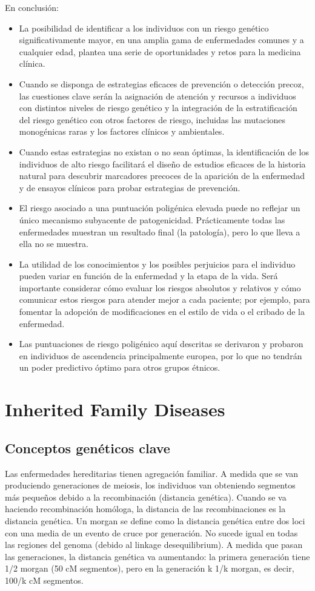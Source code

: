 En conclusión:
\begin{itemize}
\item La posibilidad de identificar a los individuos con un riesgo genético significativamente mayor, en una amplia gama de enfermedades comunes y a cualquier edad, plantea una serie de oportunidades y retos para la medicina clínica.
\item Cuando se disponga de estrategias eficaces de prevención o detección precoz, las cuestiones clave serán la asignación de atención y recursos a individuos con distintos niveles de riesgo genético y la integración de la estratificación del riesgo genético con otros factores de riesgo, incluidas las mutaciones monogénicas raras y los factores clínicos y ambientales.
\item Cuando estas estrategias no existan o no sean óptimas, la identificación de los individuos de alto riesgo facilitará el diseño de estudios eficaces de la historia natural para descubrir marcadores precoces de la aparición de la enfermedad y de ensayos clínicos para probar estrategias de prevención.
\item El riesgo asociado a una puntuación poligénica elevada puede no reflejar un único mecanismo subyacente de patogenicidad. Prácticamente todas las enfermedades muestran un resultado final (la patología), pero lo que lleva a ella no se muestra.
\item La utilidad de los conocimientos y los posibles perjuicios para el individuo pueden variar en función de la enfermedad y la etapa de la vida. Será importante considerar cómo evaluar los riesgos absolutos y relativos y cómo comunicar estos riesgos para atender mejor a cada paciente; por ejemplo, para fomentar la adopción de modificaciones en el estilo de vida o el cribado de la enfermedad.
\item Las puntuaciones de riesgo poligénico aquí descritas se derivaron y probaron en individuos de ascendencia principalmente europea, por lo que no tendrán un poder predictivo óptimo para otros grupos étnicos.
\end{itemize}

\chapter{Inherited Family Diseases}
\section{Conceptos genéticos clave}
Las enfermedades hereditarias tienen agregación familiar. 
A medida que se van produciendo generaciones de meiosis, los individuos van obteniendo segmentos más pequeños debido a la recombinación (distancia genética). Cuando se va haciendo recombinación homóloga, la distancia de las recombinaciones es la distancia genética.   
Un morgan se define como la distancia genética entre dos loci con una media de un evento de cruce por generación. No sucede igual en todas las regiones del genoma (debido al linkage desequilibrium). A medida que pasan las generaciones, la distancia genética va aumentando: la primera generación tiene 1/2 morgan (50 cM segmentos), pero en la generación k 1/k morgan, es decir, 100/k cM segmentos.

